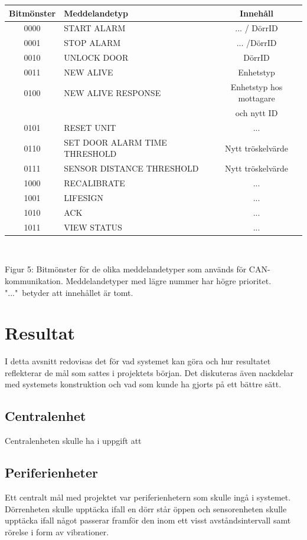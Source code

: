 \documentclass{article}
\begin{document}
\begin{tabular}{|c|l|c|}
    \hline
    Bitmönster & Meddelandetyp & Innehåll \\
    \hline
    0000 & START ALARM & ... / DörrID \\
    0001 & STOP ALARM & ... /DörrID \\
    0010 & UNLOCK DOOR & DörrID \\
    0011 & NEW ALIVE & Enhetstyp \\
    0100 & NEW ALIVE RESPONSE & Enhetstyp hos mottagare \\ 
    &&och nytt ID \\
    0101 & RESET UNIT & ... \\
    0110 & SET DOOR ALARM TIME THRESHOLD & Nytt tröskelvärde \\
    0111 & SENSOR DISTANCE THRESHOLD & Nytt tröskelvärde \\
    1000 & RECALIBRATE & ... \\
    1001 & LIFESIGN & ... \\
    1010 & ACK & ... \\
    1011 & VIEW STATUS & ... \\
    \hline
\end{tabular}
\\
\begin{center}
\caption{Figur 5: Bitmönster för de olika meddelandetyper som används för CAN-kommunikation. Meddelandetyper med lägre nummer har högre prioritet. "..."\ betyder att innehållet är tomt.}
\end{center}

\section{Resultat}
I detta avsnitt redovisas det för vad systemet kan göra och hur resultatet reflekterar de mål som sattes i projektets början. Det diskuteras även nackdelar med systemets konstruktion och vad som kunde ha gjorts på ett bättre sätt.

\subsection{Centralenhet}
Centralenheten skulle ha i uppgift att 

\subsection{Periferienheter}
Ett centralt mål med projektet var periferienhetern som skulle ingå i systemet. Dörrenheten skulle upptäcka ifall en dörr står öppen och sensorenheten skulle upptäcka ifall något passerar framför den inom ett visst avståndsintervall samt rörelse i form av vibrationer.
\end{document}

